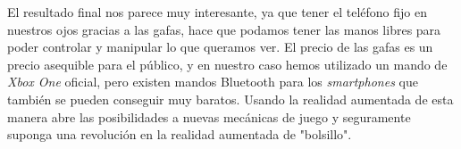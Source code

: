 El resultado final nos parece muy interesante, ya que tener el teléfono fijo en nuestros ojos gracias a las gafas, hace que podamos tener las manos libres para poder controlar y manipular lo que queramos ver. El precio de las gafas es un precio asequible para el público, y en nuestro caso hemos utilizado un mando de \textit{Xbox One }oficial, pero existen mandos Bluetooth para los \textit{smartphones} que también se pueden conseguir muy baratos. Usando la realidad aumentada de esta manera abre las posibilidades a nuevas mecánicas de juego y seguramente suponga una revolución en la realidad aumentada de "bolsillo".


\noindent